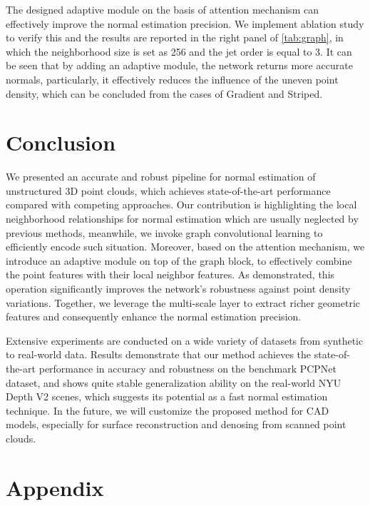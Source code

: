 \documentclass[runningheads]{llncs}
\begin{document}
 The designed adaptive module on the basis of attention mechanism can effectively improve the normal estimation precision. We implement ablation study to verify this and the results are reported in the right panel of  \cref{tab:graph}, in which the neighborhood size is set as 256 and the jet order is equal to 3. It can be seen that by adding an adaptive module, the network returns more accurate normals, particularly, it effectively reduces the influence of the uneven point density, which can be concluded from the cases of Gradient and Striped.

\section{Conclusion}
\label{sec:conclu}
We presented an accurate and robust pipeline for normal estimation of unstructured 3D point clouds, which achieves state-of-the-art performance compared with competing approaches. Our contribution is highlighting the local neighborhood relationships for normal estimation which are usually neglected by previous methods, meanwhile, we invoke graph convolutional learning to efficiently encode such situation. Moreover, based on the attention mechanism, we introduce an adaptive module on top of the graph block, to effectively combine the point features with their local neighbor features. As demonstrated, this operation significantly improves the network's robustness against point density variations. Together, we leverage the multi-scale layer to extract richer geometric features and consequently enhance the normal estimation precision. 


Extensive experiments are conducted on a wide variety of datasets from synthetic to real-world data. Results demonstrate that our method achieves the state-of-the-art performance in accuracy and robustness on the benchmark PCPNet dataset, and shows quite stable generalization ability on the real-world NYU Depth V2 scenes, which suggests its potential as a fast normal estimation technique. In the future, we will customize the proposed method for CAD models, especially for surface reconstruction and denosing from scanned point clouds. 







\clearpage




\newpage
\appendix
\section{Appendix}
\end{document}
